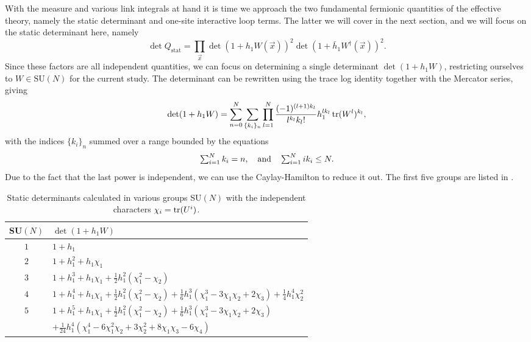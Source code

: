 With the measure and various link integrals at hand it is time we approach the
two fundamental fermionic quantities of the effective theory, namely the static
determinant and one-site interactive loop terms. The latter we will cover in the
next section, and we will focus on the static determinant here, namely
%
\begin{equation}
  \det Q_{\text{stat}} = \prod_{\vec{x}} \det ( 1 + h_1 W(\vec{x}) )^2 
    \det ( 1 + \bar{h}_1 W^{\dagger}(\vec{x}) )^2.
\end{equation}
%
Since these factors are all independent quantities, we can focus on determining
a single determinant $\det(1 + h_1 W)$, restricting ourselves to $W \in
\text{SU}(N)$ for the current study. The determinant can be rewritten using the
trace log identity together with the Mercator series, giving
%
\begin{equation}
  \det ( 1 + h_1 W ) = \sum_{n=0}^N \sum_{\{k_i\}_n} \prod_{l=1}^N
  \frac{(-1)^{(l+1)k_l}}{l^{k_l} k_l!} h_1^{l k_l} \operatorname{tr} (W^l)^{k_l},
\end{equation}
%
with the indices $\{k_i\}_n$ summed over a range bounded by the equations
%
\begin{equation} \textstyle
  \sum_{i=1}^{N} k_i = n, \hskip1em\text{and}\hskip1em
  \sum_{i=1}^N i k_i \leq N .
\end{equation}
%
Due to the fact that the last power is independent, we can use the
Caylay-Hamilton  to reduce it out. The first five
groups are listed in .

\begin{table}
  \begin{center}
    \begin{tabular}{cl} \toprule
      SU$(N)$ & $\det(1 + h_1 W)$ \\ \midrule
      $1$ & $1 + h_1$ \\
      $2$ & $1 + h_1^2 + h_1 \chi_1$ \\
      $3$ & $1 + h_1^3 + h_1\chi_1 + \frac{1}{2} h_1^2 (\chi_1^2 - \chi_2)$ \\
      $4$ & $1 + h_1^4 + h_1 \chi_1 + \frac{1}{2} h_1^2 (\chi_1^2 - \chi_2) +
      \frac{1}{6} h_1^3 (\chi_1^3 - 3 \chi_1 \chi_2 + 2 \chi_3) + \frac{1}{4}
      h_1^4 \chi_2^2$ \\
      \multirow{2}{*}{$5$} & $1 + h_1^5 + h_1 \chi_1 + \frac{1}{2} h_1^2 (\chi_1^2 - \chi_2) +
      \frac{1}{6} h_1^3 (\chi_1^3 - 3 \chi_1 \chi_2 + 2 \chi_3) $ \\
      & $ + \frac{1}{24} h_1^4 ( \chi_1^4 - 6 \chi_1^2 \chi_2 + 3 \chi_2^2 +
      8\chi_1 \chi_3 - 6\chi_4 )$ \\ \bottomrule
    \end{tabular}
  \end{center}
  \caption{Static determinants calculated in various groups SU$(N)$ with the
    independent characters $\chi_i = \operatorname{tr}(U^i)$.}
  \label{tab-static-determinant}
\end{table}


